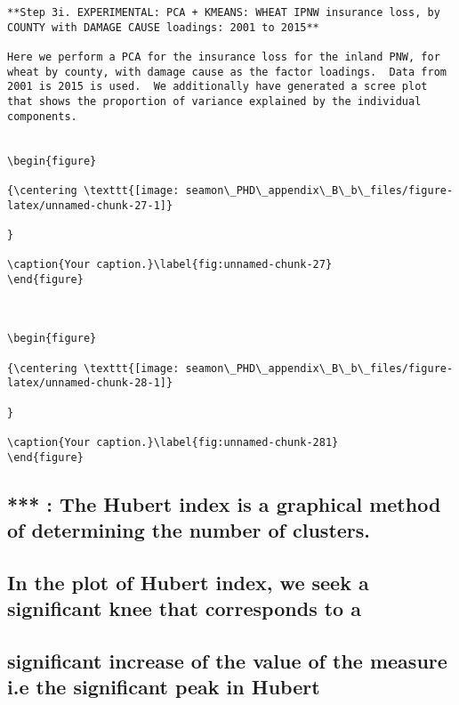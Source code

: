 \documentclass[]{article}
\begin{document}
\begin{verbatim}
**Step 3i. EXPERIMENTAL: PCA + KMEANS: WHEAT IPNW insurance loss, by COUNTY with DAMAGE CAUSE loadings: 2001 to 2015**

Here we perform a PCA for the insurance loss for the inland PNW, for wheat by county, with damage cause as the factor loadings.  Data from 2001 is 2015 is used.  We additionally have generated a scree plot that shows the proportion of variance explained by the individual components.


\begin{figure}

{\centering \texttt{[image: seamon\_PHD\_appendix\_B\_b\_files/figure-latex/unnamed-chunk-27-1]} 

}

\caption{Your caption.}\label{fig:unnamed-chunk-27}
\end{figure}



\begin{figure}

{\centering \texttt{[image: seamon\_PHD\_appendix\_B\_b\_files/figure-latex/unnamed-chunk-28-1]} 

}

\caption{Your caption.}\label{fig:unnamed-chunk-281}
\end{figure}
\end{verbatim}

\hypertarget{the-hubert-index-is-a-graphical-method-of-determining-the-number-of-clusters.}{%
\subsection{*** : The Hubert index is a graphical method of determining
the number of
clusters.}\label{the-hubert-index-is-a-graphical-method-of-determining-the-number-of-clusters.}}

\hypertarget{in-the-plot-of-hubert-index-we-seek-a-significant-knee-that-corresponds-to-a}{%
\subsection{In the plot of Hubert index, we seek a significant knee that
corresponds to
a}\label{in-the-plot-of-hubert-index-we-seek-a-significant-knee-that-corresponds-to-a}}

\hypertarget{significant-increase-of-the-value-of-the-measure-i.e-the-significant-peak-in-hubert}{%
\subsection{significant increase of the value of the measure i.e the
significant peak in
Hubert}\label{significant-increase-of-the-value-of-the-measure-i.e-the-significant-peak-in-hubert}}
\end{document}
